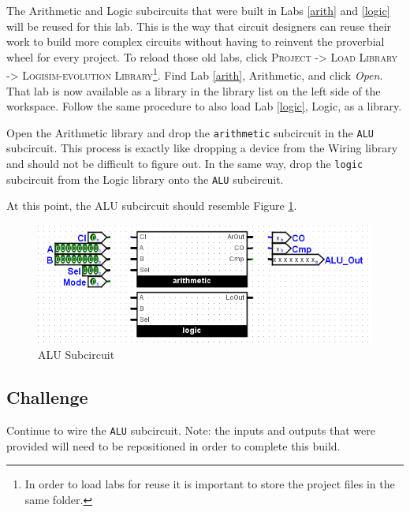The Arithmetic and Logic subcircuits that were built in Labs \ref{arith} and \ref{logic} will be reused for this lab. This is the way that circuit designers can reuse their work to build more complex circuits without having to reinvent the proverbial wheel for every project. To reload those old labs, click \textsc{Project -> Load Library -> Logisim-evolution Library}\footnote{In order to load labs for reuse it is important to store the project files in the same folder.}. Find Lab \ref{arith}, Arithmetic, and click \textit{Open}. That lab is now available as a library in the library list on the left side of the \LE workspace. Follow the same procedure to also load Lab \ref{logic}, Logic, as a library. 

Open the Arithmetic library and drop the \lstinline[columns=fixed]|arithmetic| subcircuit in the \lstinline[columns=fixed]|ALU| subcircuit. This process is exactly like dropping a device from the Wiring library and should not be difficult to figure out. In the same way, drop the \lstinline[columns=fixed]|logic| subcircuit from the Logic library onto the \lstinline[columns=fixed]|ALU| subcircuit.

At this point, the ALU subcircuit should resemble Figure \ref{fig:alu-02}.

\begin{figure}[H]
	\centering
	\includegraphics[width=\maxwidth{.95\linewidth}]{gfx/alu-02}
	\caption{ALU Subcircuit}
	\label{fig:alu-02}
\end{figure}

\subsection{Challenge}

Continue to wire the \lstinline[columns=fixed]|ALU| subcircuit. Note: the inputs and outputs that were provided will need to be repositioned in order to complete this build.

